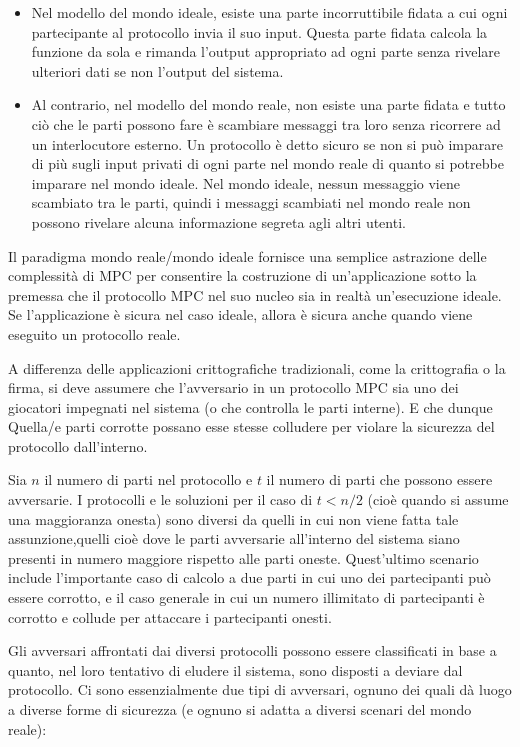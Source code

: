\documentclass[
]{book}
\providecommand{\tightlist}{%
  \setlength{\itemsep}{0pt}\setlength{\parskip}{0pt}}
\begin{document}
\begin{itemize}
\tightlist
\item
  Nel modello del mondo ideale, esiste una parte incorruttibile fidata a cui ogni partecipante al protocollo invia il suo input. Questa parte fidata calcola la funzione da sola e rimanda l'output appropriato ad ogni parte senza rivelare ulteriori dati se non l'output del sistema.
\item
  Al contrario, nel modello del mondo reale, non esiste una parte fidata e tutto ciò che le parti possono fare è scambiare messaggi tra loro senza ricorrere ad un interlocutore esterno. Un protocollo è detto sicuro se non si può imparare di più sugli input privati di ogni parte nel mondo reale di quanto si potrebbe imparare nel mondo ideale. Nel mondo ideale, nessun messaggio viene scambiato tra le parti, quindi i messaggi scambiati nel mondo reale non possono rivelare alcuna informazione segreta agli altri utenti.
\end{itemize}

Il paradigma mondo reale/mondo ideale fornisce una semplice astrazione delle complessità di MPC per consentire la costruzione di un'applicazione sotto la premessa che il protocollo MPC nel suo nucleo sia in realtà un'esecuzione ideale. Se l'applicazione è sicura nel caso ideale, allora è sicura anche quando viene eseguito un protocollo reale.

A differenza delle applicazioni crittografiche tradizionali, come la crittografia o la firma, si deve assumere che l'avversario in un protocollo MPC sia uno dei giocatori impegnati nel sistema (o che controlla le parti interne). E che dunque Quella/e parti corrotte possano esse stesse colludere per violare la sicurezza del protocollo dall'interno.

\newpage

Sia \(n\) il numero di parti nel protocollo e \(t\) il numero di parti che possono essere avversarie. I protocolli e le soluzioni per il caso di \(t< n/2\) (cioè quando si assume una maggioranza onesta) sono diversi da quelli in cui non viene fatta tale assunzione,quelli cioè dove le parti avversarie all'interno del sistema siano presenti in numero maggiore rispetto alle parti oneste. Quest'ultimo scenario include l'importante caso di calcolo a due parti in cui uno dei partecipanti può essere corrotto, e il caso generale in cui un numero illimitato di partecipanti è corrotto e collude per attaccare i partecipanti onesti.\citep{ben2016optimizing}

Gli avversari affrontati dai diversi protocolli possono essere classificati in base a quanto, nel loro tentativo di eludere il sistema, sono disposti a deviare dal protocollo. Ci sono essenzialmente due tipi di avversari, ognuno dei quali dà luogo a diverse forme di sicurezza (e ognuno si adatta a diversi scenari del mondo reale):
\end{document}
